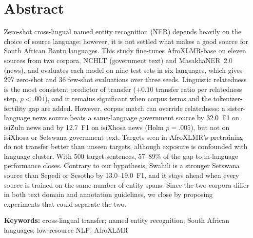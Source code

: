 \section*{Abstract}
Zero-shot cross-lingual named entity recognition (NER) depends heavily on the choice of source language; however, it is not settled what makes a good source for South African Bantu languages. This study fine-tunes AfroXLMR-base on eleven sources from two corpora, NCHLT (government text) and MasakhaNER~2.0 (news), and evaluates each model on nine test sets in six languages, which gives 297 zero-shot and 36 few-shot evaluations over three seeds. Linguistic relatedness is the most consistent predictor of transfer ($+0.10$ transfer ratio per relatedness step, $p<.001$), and it remains significant when corpus terms and the tokenizer-fertility gap are added. However, corpus match can override relatedness: a sister-language news source beats a same-language government source by 32.0~F1 on isiZulu news and by 12.7~F1 on isiXhosa news (Holm $p=.005$), but not on isiXhosa or Setswana government text. Targets seen in AfroXLMR's pretraining do not transfer better than unseen targets, although exposure is confounded with language cluster. With 500 target sentences, 57--89\% of the gap to in-language performance closes. Contrary to our hypothesis, Swahili is a stronger Setswana source than Sepedi or Sesotho by 13.0--19.0~F1, and it stays ahead when every source is trained on the same number of entity spans. Since the two corpora differ in both text domain and annotation guidelines, we close by proposing experiments that could separate the two.

\smallskip
\noindent\textbf{Keywords:} cross-lingual transfer; named entity recognition; South African languages; low-resource NLP; AfroXLMR
